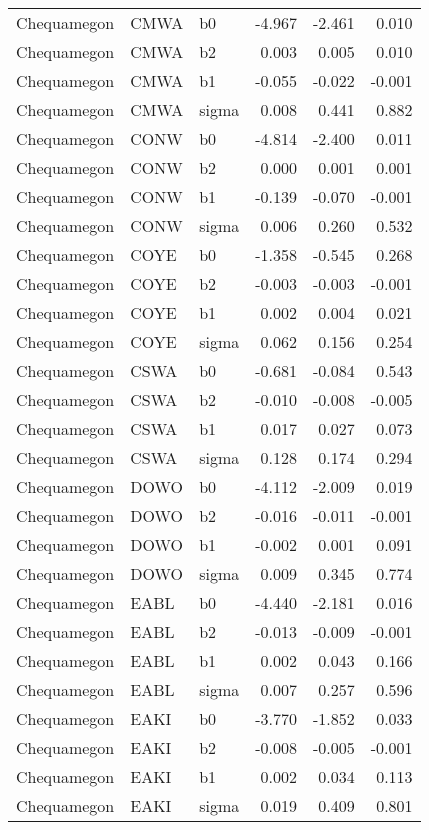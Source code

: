 \begin{table}[ht]
\begin{center}
\begin{tabular}{lllrrr}
  Chequamegon & CMWA & b0 & -4.967 & -2.461 & 0.010 \\ 
  Chequamegon & CMWA & b2 & 0.003 & 0.005 & 0.010 \\ 
  Chequamegon & CMWA & b1 & -0.055 & -0.022 & -0.001 \\ 
  Chequamegon & CMWA & sigma & 0.008 & 0.441 & 0.882 \\ 
  Chequamegon & CONW & b0 & -4.814 & -2.400 & 0.011 \\ 
  Chequamegon & CONW & b2 & 0.000 & 0.001 & 0.001 \\ 
  Chequamegon & CONW & b1 & -0.139 & -0.070 & -0.001 \\ 
  Chequamegon & CONW & sigma & 0.006 & 0.260 & 0.532 \\ 
  Chequamegon & COYE & b0 & -1.358 & -0.545 & 0.268 \\ 
  Chequamegon & COYE & b2 & -0.003 & -0.003 & -0.001 \\ 
  Chequamegon & COYE & b1 & 0.002 & 0.004 & 0.021 \\ 
  Chequamegon & COYE & sigma & 0.062 & 0.156 & 0.254 \\ 
  Chequamegon & CSWA & b0 & -0.681 & -0.084 & 0.543 \\ 
  Chequamegon & CSWA & b2 & -0.010 & -0.008 & -0.005 \\ 
  Chequamegon & CSWA & b1 & 0.017 & 0.027 & 0.073 \\ 
  Chequamegon & CSWA & sigma & 0.128 & 0.174 & 0.294 \\ 
  Chequamegon & DOWO & b0 & -4.112 & -2.009 & 0.019 \\ 
  Chequamegon & DOWO & b2 & -0.016 & -0.011 & -0.001 \\ 
  Chequamegon & DOWO & b1 & -0.002 & 0.001 & 0.091 \\ 
  Chequamegon & DOWO & sigma & 0.009 & 0.345 & 0.774 \\ 
  Chequamegon & EABL & b0 & -4.440 & -2.181 & 0.016 \\ 
  Chequamegon & EABL & b2 & -0.013 & -0.009 & -0.001 \\ 
  Chequamegon & EABL & b1 & 0.002 & 0.043 & 0.166 \\ 
  Chequamegon & EABL & sigma & 0.007 & 0.257 & 0.596 \\ 
  Chequamegon & EAKI & b0 & -3.770 & -1.852 & 0.033 \\ 
  Chequamegon & EAKI & b2 & -0.008 & -0.005 & -0.001 \\ 
  Chequamegon & EAKI & b1 & 0.002 & 0.034 & 0.113 \\ 
  Chequamegon & EAKI & sigma & 0.019 & 0.409 & 0.801 \\ 

\end{tabular}
\end{center}
\end{table}
